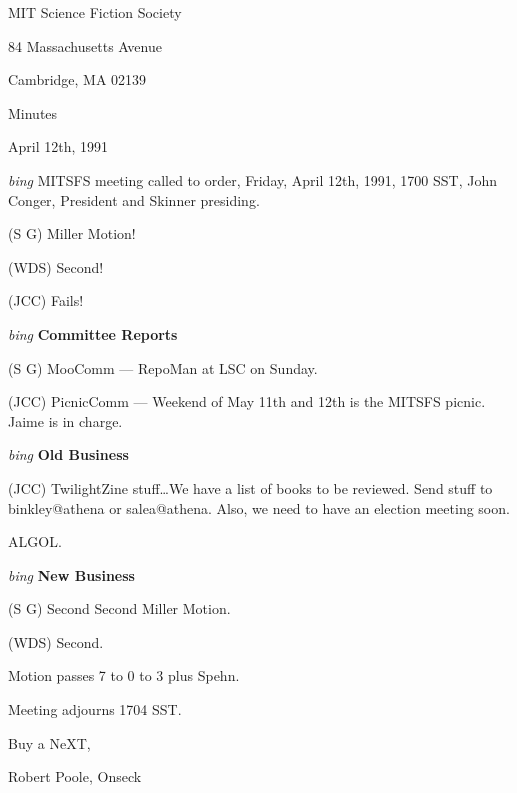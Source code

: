 \setlength{\topmargin}{-0.5in}
\setlength{\oddsidemargin}{0.0in}
\setlength{\evensidemargin}{0.0in}
\setlength{\textheight}{9in}
\setlength{\textwidth}{6.5in}



\begin{center}
MIT Science Fiction Society

84 Massachusetts Avenue

Cambridge, MA 02139

\vspace{0.2in}
Minutes

April 12th, 1991

\end{center}

\vspace{0.15in}
{\em bing\/}  MITSFS meeting called to order, Friday, April 12th, 1991,
1700 SST, John Conger, President and Skinner presiding.

(S G) Miller Motion!

(WDS) Second!

(JCC) Fails!

\vspace{0.15in}
{\em bing\/} {\bf Committee Reports\/}

(S G) MooComm --- RepoMan at LSC on Sunday.

(JCC) PicnicComm --- Weekend of May 11th and 12th is the MITSFS picnic.  Jaime
is in charge.

\vspace{.15in}
{\em bing\/} {\bf Old Business\/}

(JCC) TwilightZine stuff\ldots  We have a list of books to be reviewed.  Send
stuff to binkley@athena or salea@athena.  Also, we need to have an election
meeting soon.

ALGOL.

\vspace{0.15in}
{\em bing\/} {\bf New Business\/}

(S G) Second Second Miller Motion.

(WDS) Second.

Motion passes 7 to 0 to 3 plus Spehn.

Meeting adjourns 1704 SST.

\vspace{0.15in}
\begin{center}
Buy a NeXT,

Robert Poole, Onseck
\end{center}

